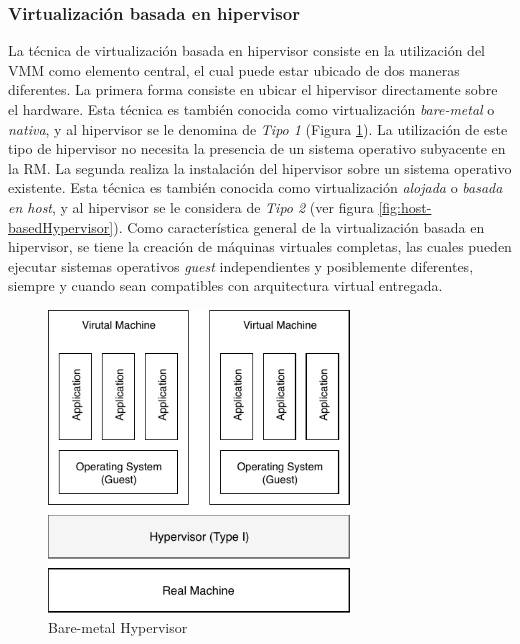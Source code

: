 \subsubsection{Virtualización basada en hipervisor}
\vspace{5mm}
La técnica de virtualización basada en hipervisor consiste en la utilización del VMM como elemento central, el cual puede estar ubicado de dos maneras diferentes. La primera forma consiste en ubicar el hipervisor directamente sobre el hardware. Esta técnica es también conocida como virtualización \textit{bare-metal} o \textit{nativa}, y al hipervisor se le denomina de \textit{Tipo 1} (Figura \ref{fig:Bare-metalHypervisor}).  La utilización de este tipo de hipervisor no necesita la presencia de un sistema operativo subyacente en la RM. La segunda realiza la instalación del hipervisor sobre un sistema operativo existente. Esta técnica es también conocida como virtualización \textit{alojada} o \textit{basada en host}, y al hipervisor se le considera de \textit{Tipo 2} (ver figura \ref{fig:host-basedHypervisor}). Como característica general de la virtualización basada en hipervisor, se tiene la creación de máquinas virtuales completas, las cuales pueden ejecutar sistemas operativos \textit{guest} independientes y posiblemente diferentes, siempre y cuando sean compatibles con arquitectura virtual entregada. 


\begin{figure}[!hbtp]
	\centering
	\includegraphics[width=8cm]{Pictures/bare-metalHypervisor.pdf}
	\vspace{-0.2cm}
	\caption{Bare-metal Hypervisor}
	\label{fig:Bare-metalHypervisor}
\end{figure}

